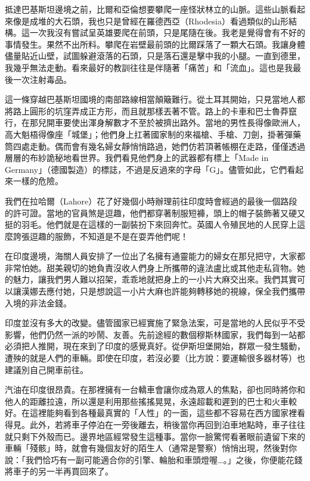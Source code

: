 抵達巴基斯坦邊境之前，比爾和亞倫想要攀爬一座怪狀林立的山脈。這些山脈看起來像是成堆的大石頭，我也只是曾經在羅德西亞（Rhodesia）看過類似的山形結構。這一次我沒有嘗試呈英雄要爬在前頭，只是尾隨在後。我老是覺得會有不好的事情發生。果然不出所料。攀爬在岩壁最前頭的比爾踩落了一顆大石頭。我讓身體儘量貼近山壁，試圖躲避滾落的石頭，只是落石還是擊中我的小腿。一直到德里，我幾乎無法走動。看來最好的教訓往往是伴隨著「痛苦」和「流血」。這也是我最後一次注射毒品。

這一條穿越巴基斯坦國境的南部路線相當顛簸難行。從土耳其開始，只見當地人都將路上圓形的坑窪弄成正方形，而且就那樣丟著不管。路上的卡車和巴士魯莽竄行，在那兒開車要使出渾身解數才不至於被擠出路外。當地的男性長得像歐洲人，高大魁梧得像座「城堡」；他們身上扛著國家制的來福槍、手槍、刀劍，掛著彈藥筒四處走動。偶而會有幾名婦女靜悄悄路過，她們仿若頂著帳棚在走路，僅僅透過層層的布紗詭秘地看世界。我們看見他們身上的武器都有標上「Made
in
Germany」（德國製造）的標誌，不過是反過來的字母「G」。儘管如此，它們看起來一樣的危險。

我們在拉哈爾（Lahore）花了好幾個小時辦理前往印度時會經過的最後一個路段的許可證。當地的官員煞是逗趣，他們都穿著制服短褲，頭上的帽子裝飾著又硬又挺的羽毛。他們就是在這樣的一副裝扮下來回奔忙。英國人令殖民地的人民穿上這麼誇張逗趣的服飾，不知道是不是在耍弄他們呢！

在印度邊境，海關人員安排了一位出了名擁有通靈能力的婦女在那兒把守，大家都非常怕她。甜美親切的她負責沒收人們身上所攜帶的違法盧比或其他走私貨物。她的魅力，讓我們男人難以招架，乖乖地就把身上的一小片大麻交出來。我們其實可以讓漢娜去應付她，只是想說這一小片大麻也許能夠轉移她的視線，保全我們攜帶入境的非法金錢。

印度並沒有多大的改變。儘管國家已經實施了緊急法案，可是當地的人民似乎不受影響，他們仍然一派的吵鬧、友善。先前途經的數個穆斯林國家，我們每到一站都必須把人推開，現在來到了印度的感覺真好。從伊斯坦堡開始，群眾一發生騷動，遭殃的就是人們的車輛。即使在印度，若沒必要（比方說：要運輸很多器材等）也建議別自己開車前往。

汽油在印度很昂貴。在那裡擁有一台轎車會讓你成為眾人的焦點，卻也同時將你和他人的距離拉遠，所以還是利用那些搖搖晃晃，永遠超載和遲到的巴士和火車較好。在這裡能夠看到各種最真實的「人性」的一面，這些都不容易在西方國家裡看得見。此外，若將車子停泊在一旁後離去，稍後當你再回到泊車地點時，車子往往就只剩下外殼而已。邊界地區經常發生這種事。當你一臉驚愕看著眼前遺留下來的車輛「殘骸」時，就會有幾個友好的陌生人（通常是警察）悄悄出現，然後對你說：「我們恰巧有一副可能適合你的引擎、輪胎和車頭燈喔\ldots{}。」之後，你便能花錢將車子的另一半再買回來了。

